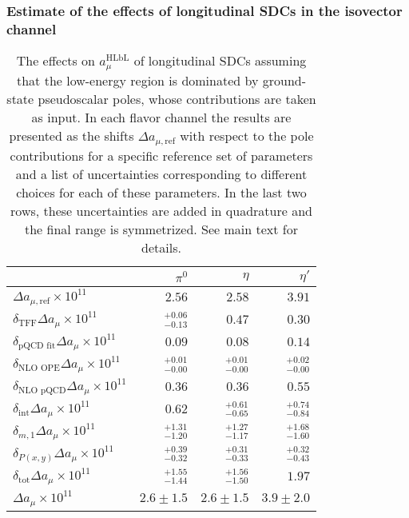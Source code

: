 
\subsubsection{Estimate of the effects of longitudinal SDCs in the isovector channel}
\label{Sec:ResultsIV}

\begin{table}
	\caption{The effects on $a_\mu^{\text{HLbL}}$ of longitudinal SDCs assuming that the low-energy region is dominated by ground-state pseudoscalar poles, whose contributions are taken as input. In each flavor channel the results are presented as the shifts $\Delta a_{\mu,\text{ref}}$ with respect to the pole contributions for a specific reference set of parameters and a list of uncertainties corresponding to different choices for each of these parameters. In the last two rows, these uncertainties are added in quadrature and the final range is symmetrized. See main text for details.}
	\label{Tab:results}
	{\def\arraystretch{1.5}\tabcolsep=10pt
		\begin{tabular*}{\columnwidth}{@{\extracolsep{\fill}}lrrr@{}}
			\hline
			& $\pi^0$ & $\eta$ & $\eta'$ \\ \hline
			$\Delta a_{\mu,\text{ref}} \times 10^{11}$ & $2.56$ & $2.58$ & $3.91$ \\ \hline
			$\delta_\text{TFF} \Delta a_{\mu} \times 10^{11}$ & $~^{+0.06}_{-0.13}$ & $0.47$ & $0.30$ \\
			$\delta_\text{pQCD fit} \Delta a_\mu \times 10^{11}$ & $0.09$ & $0.08$ & $0.14$ \\
			$\delta_\text{NLO OPE} \Delta a_{\mu} \times 10^{11}$ & $~^{+0.01}_{-0.00}$ & $~^{+0.01}_{-0.00}$ & $~^{+0.02}_{-0.00}$ \\
			$\delta_\text{NLO pQCD} \Delta a_{\mu} \times 10^{11}$ & $0.36$ & $0.36$ & $0.55$ \\
			$\delta_\text{int} \Delta a_{\mu} \times 10^{11}$ & $0.62$ & $~^{+0.61}_{-0.65}$ & $~^{+0.74}_{-0.84}$ \\
			$\delta_{m, 1} \Delta a_{\mu} \times 10^{11}$ & $~^{+1.31}_{-1.20}$ & $~^{+1.27}_{-1.17}$ & $~^{+1.68}_{-1.60}$ \\
			$\delta_{P(x,y)} \Delta a_{\mu} \times 10^{11}$ & $~^{+0.39}_{-0.32}$ & $~^{+0.31}_{-0.33}$ & $~^{+0.32}_{-0.43}$ \\ \hline
			$\delta_\text{tot} \Delta a_{\mu} \times 10^{11}$ & $~^{+1.55}_{-1.44}$ & $~^{+1.56}_{-1.50}$ & $1.97$ \\
			$\Delta a_{\mu} \times 10^{11}$ & $2.6\pm 1.5$ & $2.6\pm 1.5$ & $3.9\pm 2.0$ \\ \hline
		\end{tabular*}
	}
\end{table}

